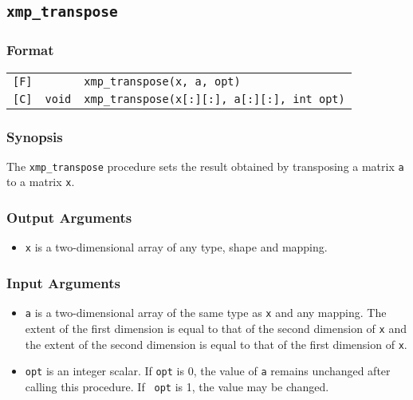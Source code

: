 \subsection{\tt xmp\_transpose}

\subsubsection*{Format}

\begin{tabular}{lll}

\verb![F]!&            & {\tt xmp\_transpose(x, a, opt)}\\

\verb![C]!& {\tt void} & {\tt xmp\_transpose(x[:][:], a[:][:], int opt)}\\

\end{tabular}

\subsubsection*{Synopsis}

The {\tt xmp\_transpose} procedure sets the result obtained by
transposing a matrix {\tt a} to a matrix {\tt x}.

\subsubsection*{Output Arguments}
\begin{itemize}
 \item {\tt x} is a two-dimensional array of any type, shape and mapping.
\end{itemize}

\subsubsection*{Input Arguments}
\begin{itemize}
 \item {\tt a} is a two-dimensional array of the same type as {\tt x}
       and any mapping. The extent of the first dimension is equal to
       that of the second dimension of {\tt x} and the extent of the
       second dimension is equal to that of the first dimension of
       {\tt x}.
 \item {\tt opt} is an integer scalar. If {\tt opt} is 0, the value of
       {\tt a} remains unchanged after calling this procedure. If {\tt
       opt} is 1, the value may be changed.
\end{itemize}


